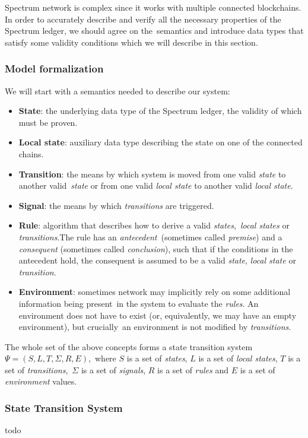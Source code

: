 Spectrum network is complex since it works with multiple connected blockchains.
In order to accurately describe and verify all the necessary properties of the Spectrum ledger, we should agree on the\
semantics and introduce data types that satisfy some validity conditions which we will describe in this section.

\subsubsection{Model formalization}
We will start with a semantics needed to describe our system:
\begin{itemize}
    \item \textbf{State}: the underlying data type of the Spectrum ledger, the validity of which must be proven.

    \item \textbf{Local state}: auxiliary data type describing the state on one of the connected chains.

    \item \textbf{Transition}: the means by which system is moved from one valid \textit{state} to another valid\
    \textit{state} or from one valid \textit{local state} to another valid \textit{local state}.

    \item \textbf{Signal}: the means by which \textit{transitions} are triggered.

    \item \textbf{Rule}: algorithm that describes how to derive a valid \textit{states},\
    \textit{local states} or \textit{transitions}.The rule has an \textit{antecedent}\
    (sometimes called \textit{premise}) and a
    \textit{consequent} (sometimes called \textit{conclusion}), such that if the
    conditions in the antecedent hold, the consequent is assumed to be a valid
    \textit{state}, \textit{local state} or \textit{transition}.

    \item \textbf{Environment}: sometimes network may implicitly rely on some additional information being present\
    in the system to evaluate the \textit{rules}.
    An environment does not have to exist (or, equivalently, we may have an empty environment), but crucially\
    an environment is not modified by \textit{transitions}.
\end{itemize}

The whole set of the above concepts forms a state transition system ${\Psi = (S, L, T, \Sigma, R, E)}$,\
where $S$ is a set of \textit{states}, $L$ is a set of \textit{local states}, $T$ is a set of \textit{transitions},\
$\Sigma$ is a set of \textit{signals}, $R$ is a set of \textit{rules} and $E$ is a set of \textit{environment} values.

\subsubsection{State Transition System}
todo
